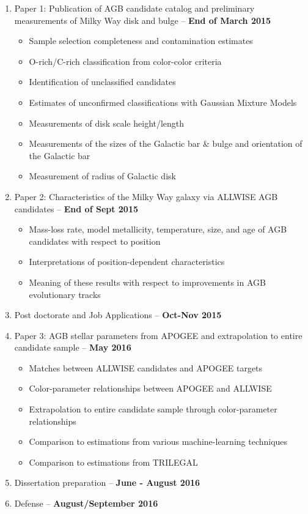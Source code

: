 \begin{enumerate}
\item Paper 1: Publication of AGB candidate catalog and preliminary measurements of Milky Way disk and bulge -- \textbf{End of March 2015}
	\begin{itemize}
		\item Sample selection completeness and contamination estimates
		\item O-rich/C-rich classification from color-color criteria
		\item Identification of unclassified candidates
		\item Estimates of unconfirmed classifications with Gaussian Mixture Models
		\item Measurements of disk scale height/length
		\item Measurements of the sizes of the Galactic bar \& bulge and orientation of the Galactic bar
		\item Measurement of radius of Galactic disk
	\end{itemize}	

\item Paper 2: Characteristics of the Milky Way galaxy via ALLWISE AGB candidates -- \textbf{End of Sept 2015}
	\begin{itemize}
		\item Mass-loss rate, model metallicity, temperature, size, and age of AGB candidates with respect to position
		\item Interpretations of position-dependent characteristics
		\item Meaning of these results with respect to improvements in AGB evolutionary tracks
	\end{itemize}
	
\item Post doctorate and Job Applications -- \textbf{Oct-Nov 2015}
\item Paper 3: AGB stellar parameters from APOGEE and extrapolation to entire candidate sample -- \textbf{May 2016}
	\begin{itemize}
		\item Matches between ALLWISE candidates and APOGEE targets
		\item Color-parameter relationships between APOGEE and ALLWISE
		\item Extrapolation to entire candidate sample through color-parameter relationships
		\item Comparison to estimations from various machine-learning techniques
		\item Comparison to estimations from TRILEGAL
	\end{itemize}
\item Dissertation preparation -- \textbf{June - August 2016}
\item Defense -- \textbf{August/September 2016}
\end{enumerate}

